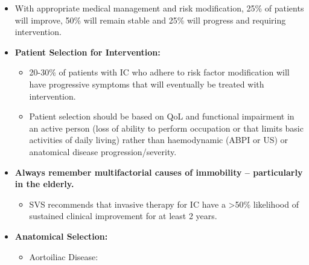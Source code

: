 \documentclass[
]{book}
\providecommand{\tightlist}{%
  \setlength{\itemsep}{0pt}\setlength{\parskip}{0pt}}
\begin{document}
\begin{itemize}
\item
  With appropriate medical management and risk modification, 25\% of
  patients will improve, 50\% will remain stable and 25\% will progress
  and requiring intervention. \citep{conte2015, norgren2007}
\item
  \textbf{Patient Selection for Intervention:}

  \begin{itemize}
  \item
    20-30\% of patients with IC who adhere to risk factor
    modification will have progressive symptoms that will eventually
    be treated with intervention.
  \item
    Patient selection should be based on QoL and functional
    impairment in an active person (loss of ability to perform
    occupation or that limits basic activities of daily living)
    rather than haemodynamic (ABPI or US) or anatomical disease
    progression/severity.
  \end{itemize}
\item
  \textbf{Always remember multifactorial causes of immobility --
  particularly in the elderly.}

  \begin{itemize}
  \tightlist
  \item
    SVS recommends that invasive therapy for IC have a \textgreater50\%
    likelihood of sustained clinical improvement for at least 2
    years.
  \end{itemize}
\item
  \textbf{Anatomical Selection:}

  \begin{itemize}
  \item
    Aortoiliac Disease:


\end{itemize}
\end{itemize}
\end{document}
